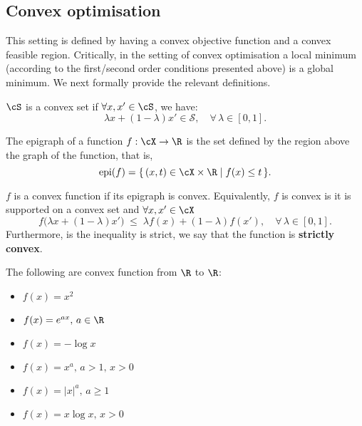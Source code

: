 \subsection{Convex optimisation}
\label{subsec:convex_opt}


This setting is defined by having a convex objective function and a convex feasible region. Critically, in the setting of convex optimisation a local minimum (according to the first/second order conditions presented above) is a global minimum. We next formally provide the relevant definitions.

\begin{definition} $\cS$ is a convex set if $\forall x,x'\in\cS$, we have:
\begin{equation}
	\lambda x + (1 - \lambda)x' \in \mathcal{S},
	\quad \forall\, \lambda \in [0, 1].
\end{equation}
\end{definition}



\begin{definition} The epigraph of a function $f:\cX\to\R$ is the set defined by the region above the graph of the function, that is, 
\begin{equation}
	\operatorname{epi}(f) = \{\, (x, t) \in \cX \times \R \mid f(x) \le t \,\}.
\end{equation}


\begin{definition} $f$ is a convex function if its epigraph is convex. Equivalently, $f$ is convex is it is supported on a convex set and $\forall x,x'\in\cX$
\begin{equation}
	f\bigl(\lambda x + (1 - \lambda)x'\bigr)
	\;\leq\;
	\lambda f(x) + (1 - \lambda) f(x'),
	\quad \forall\, \lambda \in [0, 1].
\end{equation}
Furthermore, is the inequality is strict, we say that the function is \textbf{strictly convex}.
\end{definition}

\end{definition}


\begin{mdframed}[style=ejemplo, frametitle={\center Example: Convex functions (in 1D)}]

The following are convex function from $\R$ to $\R$:

\begin{itemize}
	\item $f(x) = x^2$
	\item $f(x) = e^{ax},\, a\in\R$
	\item $f(x) = -\log x$
	\item $f(x) = x^a,\, a>1,\, x>0$
	\item $f(x) = |x|^a,\, a\geq 1$
	\item $f(x) = x\log x,\, x>0$
\end{itemize}

\end{mdframed}



